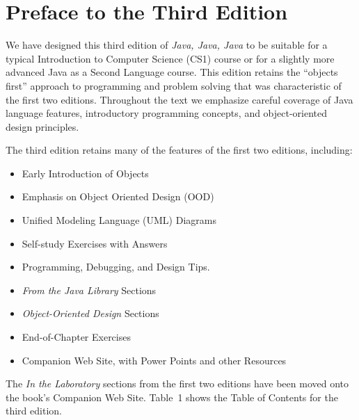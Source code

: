 \chapter*{Preface to the Third Edition}

We have designed this third edition of {\it Java, Java, Java} to be
suitable for a typical Introduction to Computer Science (CS1) course
or for a slightly more advanced Java as a Second Language course. This
edition retains the ``objects first'' approach to programming and
problem solving that was characteristic of the first two editions.
Throughout the text we emphasize careful coverage of Java language
features, introductory programming concepts, and object-oriented
design principles.

The third edition retains many of the features of the first two
editions, including:

\begin{itemize}
\item Early Introduction of Objects
\item Emphasis on Object Oriented Design (OOD)
\item Unified Modeling Language (UML) Diagrams
\item Self-study Exercises with Answers
\item Programming, Debugging, and Design Tips.
\item {\em From the Java Library} Sections
\item {\em Object-Oriented Design} Sections
\item End-of-Chapter Exercises
\item Companion Web Site, with Power Points and other Resources
\end{itemize}

\noindent The {\em In the Laboratory} sections from the first two
editions have been moved onto the book's Companion Web Site. Table~1
shows the Table of Contents for the third edition.

